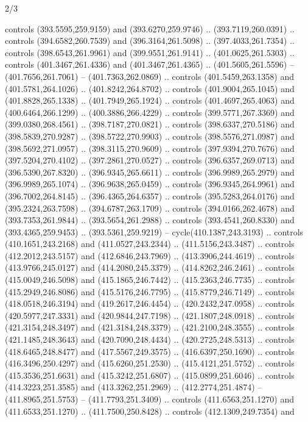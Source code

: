 \begin{flagdescription}{2/3}
\begin{scope}[xshift=0.5\flaglength,yshift=0.5\flagwidth,scale=\flagwidth/495.65]
\begin{scope}[y=0.8pt, x=0.8pt, yscale=-1,shift={(-463.76,-309.78)}]
  controls (393.5595,259.9159) and (393.6270,259.9746) .. (393.7119,260.0391) ..
  controls (394.6582,260.7539) and (396.3164,261.5098) .. (397.4033,261.7354) ..
  controls (398.6543,261.9961) and (399.9551,261.9141) .. (401.0625,261.5303) ..
  controls (401.3467,261.4336) and (401.3467,261.4365) .. (401.5605,261.5596) --
  (401.7656,261.7061) -- (401.7363,262.0869) .. controls (401.5459,263.1358) and
  (401.5781,264.1026) .. (401.8242,264.8702) .. controls (401.9004,265.1045) and
  (401.8828,265.1338) .. (401.7949,265.1924) .. controls (401.4697,265.4063) and
  (400.6464,266.1299) .. (400.3886,266.4229) .. controls (399.5771,267.3369) and
  (399.0380,268.4561) .. (398.7187,270.0821) .. controls (398.6337,270.5186) and
  (398.5839,270.9287) .. (398.5722,270.9903) .. controls (398.5576,271.0987) and
  (398.5692,271.0957) .. (398.3115,270.9609) .. controls (397.9394,270.7676) and
  (397.5204,270.4102) .. (397.2861,270.0527) .. controls (396.6357,269.0713) and
  (396.5390,267.8320) .. (396.9345,265.6611) .. controls (396.9989,265.2979) and
  (396.9989,265.1074) .. (396.9638,265.0459) .. controls (396.9345,264.9961) and
  (396.7002,264.8145) .. (396.4365,264.6357) .. controls (395.5283,264.0176) and
  (395.2324,263.7598) .. (394.6787,263.1709) .. controls (394.0166,262.4678) and
  (393.7353,261.9844) .. (393.5654,261.2988) .. controls (393.4541,260.8330) and
  (393.4365,259.9453) .. (393.5361,259.9219) -- cycle(410.1387,243.3193) ..
  controls (410.1651,243.2168) and (411.0527,243.2344) .. (411.5156,243.3487) ..
  controls (412.2012,243.5157) and (412.6846,243.7969) .. (413.3906,244.4619) ..
  controls (413.9766,245.0127) and (414.2080,245.3379) .. (414.8262,246.2461) ..
  controls (415.0049,246.5098) and (415.1865,246.7442) .. (415.2363,246.7735) ..
  controls (415.2949,246.8086) and (415.5176,246.7795) .. (415.8779,246.7149) ..
  controls (418.0518,246.3194) and (419.2617,246.4454) .. (420.2432,247.0958) ..
  controls (420.5977,247.3331) and (420.9844,247.7198) .. (421.1807,248.0918) ..
  controls (421.3154,248.3497) and (421.3184,248.3379) .. (421.2100,248.3555) ..
  controls (421.1485,248.3643) and (420.7090,248.4434) .. (420.2725,248.5313) ..
  controls (418.6465,248.8477) and (417.5567,249.3575) .. (416.6397,250.1690) ..
  controls (416.3496,250.4297) and (415.6260,251.2530) .. (415.4121,251.5752) ..
  controls (415.3536,251.6631) and (415.3242,251.6807) .. (415.0899,251.6046) ..
  controls (414.3223,251.3585) and (413.3262,251.2969) .. (412.2774,251.4874) --
  (411.8965,251.5753) -- (411.7793,251.3409) .. controls (411.6563,251.1270) and
  (411.6533,251.1270) .. (411.7500,250.8428) .. controls (412.1309,249.7354) and

\end{scope}
\end{scope}
\end{flagdescription}
